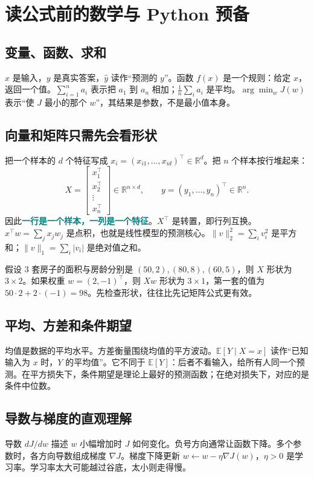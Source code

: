 \documentclass[UTF8,11pt,oneside]{ctexbook}
\newcommand{\key}[1]{\textcolor{teal}{\bfseries #1}}
\newcommand{\R}{\mathbb{R}}
\newcommand{\E}{\mathbb{E}}
\begin{document}
\chapter{读公式前的数学与 Python 预备}
\section{变量、函数、求和}
$x$ 是输入，$y$ 是真实答案，$\hat y$ 读作“预测的 $y$”。函数 $f(x)$ 是一个规则：给定 $x$，返回一个值。$\sum_{i=1}^{n}a_i$ 表示把 $a_1$ 到 $a_n$ 相加；$\frac1n\sum_i a_i$ 是平均。$\arg\min_w J(w)$ 表示“使 $J$ 最小的那个 $w$”，其结果是参数，不是最小值本身。

\section{向量和矩阵只需先会看形状}
把一个样本的 $d$ 个特征写成 $x_i=(x_{i1},\ldots,x_{id})^\top\in\R^d$。把 $n$ 个样本按行堆起来：
\[
X=\begin{bmatrix}x_1^\top\\x_2^\top\\\vdots\\x_n^\top\end{bmatrix}\in\R^{n\times d},\qquad
y=(y_1,\ldots,y_n)^\top\in\R^n.
\]
因此\key{一行是一个样本，一列是一个特征}。$X^\top$ 是转置，即行列互换。$x^\top w=\sum_jx_jw_j$ 是点积，也就是线性模型的预测核心。$\|v\|_2^2=\sum_i v_i^2$ 是平方和；$\|v\|_1=\sum_i|v_i|$ 是绝对值之和。

假设 3 套房子的面积与房龄分别是 $(50,2),(80,8),(60,5)$，则 $X$ 形状为 $3\times2$。如果权重 $w=(2,-1)^\top$，则 $Xw$ 形状为 $3\times1$，第一套的值为 $50\cdot2+2\cdot(-1)=98$。先检查形状，往往比先记矩阵公式更有效。

\section{平均、方差和条件期望}
均值是数据的平均水平。方差衡量围绕均值的平方波动。$\E[Y\mid X=x]$ 读作“已知输入为 $x$ 时，$Y$ 的平均值”。它不同于 $\E[Y]$：后者不看输入，给所有人同一个预测。在平方损失下，条件期望是理论上最好的预测函数；在绝对损失下，对应的是条件中位数。

\section{导数与梯度的直观理解}
导数 $dJ/dw$ 描述 $w$ 小幅增加时 $J$ 如何变化。负号方向通常让函数下降。多个参数时，各方向导数组成梯度 $\nabla J$。梯度下降更新 $w\leftarrow w-\eta\nabla J(w)$，$\eta>0$ 是学习率。学习率太大可能越过谷底，太小则走得慢。
\end{document}
